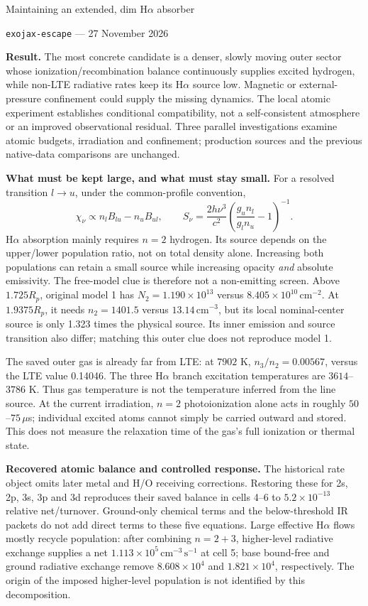 \documentclass[10pt,a4paper]{article}
\begin{document}
\begin{center}
{\Large Maintaining an extended, dim H$\alpha$ absorber}\par\vspace{4pt}
\texttt{exojax-escape} --- 27 November 2026
\end{center}

\textbf{Result.} The most concrete candidate is a denser, slowly moving outer
sector whose ionization/recombination balance continuously supplies excited
hydrogen, while non-LTE radiative rates keep its H$\alpha$ source low.
Magnetic or external-pressure confinement could supply the missing dynamics.
The local atomic experiment establishes conditional compatibility, not a
self-consistent atmosphere or an improved observational residual. Three
parallel investigations examine atomic budgets, irradiation and confinement;
production sources and the previous native-data comparisons are unchanged.

\textbf{What must be kept large, and what must stay small.}
For a resolved transition $l\to u$, under the common-profile convention,
\[
 \chi_\nu\propto n_l B_{lu}-n_u B_{ul},\qquad
 S_\nu=\frac{2h\nu^3}{c^2}
 \left(\frac{g_u n_l}{g_l n_u}-1\right)^{-1}.
\]
H$\alpha$ absorption mainly requires $n=2$ hydrogen. Its source depends on
the upper/lower population ratio, not on total density alone. Increasing both
populations can retain a small source while increasing opacity \emph{and}
absolute emissivity. The free-model clue is therefore not a non-emitting screen.
Above $1.725R_p$, original model 1 has $N_2=1.190\times10^{13}$ versus
$8.405\times10^{10}\,\mathrm{cm}^{-2}$. At $1.9375R_p$, it needs
$n_2=1401.5$ versus $13.14\,\mathrm{cm}^{-3}$, but its local nominal-center
source is only 1.323 times the physical source. Its inner emission and source
transition also differ; matching this outer clue does not reproduce model 1.

The saved outer gas is already far from LTE: at $7902$ K,
$n_3/n_2=0.00567$, versus the LTE value 0.14046. The three H$\alpha$ branch
excitation temperatures are $3614$--$3786$ K. Thus gas temperature is not the
temperature inferred from the line source. At the current irradiation,
$n=2$ photoionization alone acts in roughly $50$--$75\,\mu$s; individual
excited atoms cannot simply be carried outward and stored. This does not
measure the relaxation time of the gas's full ionization or thermal state.

\textbf{Recovered atomic balance and controlled response.}
The historical rate object omits later metal and H/O receiving corrections.
Restoring these for 2s, 2p, 3s, 3p and 3d reproduces their saved balance in
cells 4--6 to $5.2\times10^{-13}$ relative net/turnover. Ground-only chemical
terms and the below-threshold IR packets do not add direct terms to these
five equations. Large effective H$\alpha$ flows mostly recycle population:
after combining $n=2+3$, higher-level radiative exchange supplies a net
$1.113\times10^5\,\mathrm{cm}^{-3}\,\mathrm{s}^{-1}$ at cell 5; base
bound-free and ground radiative exchange remove $8.608\times10^4$ and
$1.821\times10^4$, respectively. The origin of the imposed higher-level
population is not identified by this decomposition.
\end{document}
